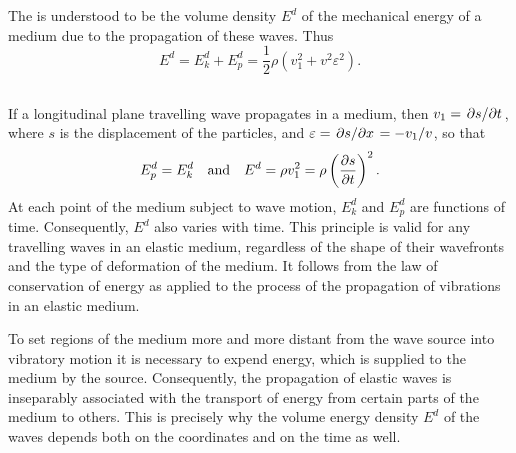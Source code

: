 The  is understood to be the volume density $E^{d}$ of the mechanical energy of a medium due to the propagation of these waves. Thus
\begin{equation*}%
E^{d} = E^{d}_{k} + E^{d}_{p} =  \frac{1}{2} \rho ( v_{1}^{2} + v^{2} \varepsilon^{2}).
\end{equation*}

\subsection{}\label{30.3.4} If a longitudinal plane travelling wave  propagates in a medium, then $v_{1} = \pdv*{s}{t}$, where $s$ is the displacement of the particles, and $\varepsilon = \pdv*{s}{x} = - v_{1}/v$, so that
\begin{equation*}%
E^{d}_{p} = E^{d}_{k} \qand E^{d} = \rho v_{1}^{2} = \rho \left( \pdv{s}{t}\right)^{2}.
\end{equation*}
At each point of the medium subject to wave motion, $E^{d}_{k}$ and
$E^{d}_{p} $ are  functions of time. Consequently, $E^{d}$ also varies with time. This principle is valid for any travelling waves in an elastic medium, regardless of the shape of their wavefronts and the type of deformation of the medium. It follows from the law of conservation of energy as applied to the process of the propagation of vibrations in an elastic medium. 

To set regions of the medium more and more distant from the wave source into vibratory motion it is necessary to expend energy, which is supplied to the medium by the source. Consequently, the propagation of elastic waves is inseparably associated with the transport of energy from certain parts of the medium to others. This is precisely why the volume energy density $E^{d}$ of the waves depends both on the coordinates and on the time as well.

